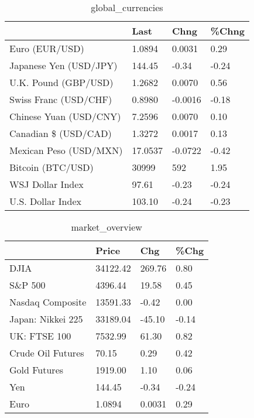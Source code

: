 \documentclass{article}%
\begin{document}
%


\begin{table}[htbp]%
\caption{global\_currencies}%
\centering%
\begin{adjustbox}{width=1\textwidth}%
\begin{tabular}{llll}
\toprule
                       &    Last &    Chng & \%Chng \\
\midrule
        Euro (EUR/USD) &  1.0894 &  0.0031 &  0.29 \\
Japanese Yen (USD/JPY) &  144.45 &   -0.34 & -0.24 \\
  U.K. Pound (GBP/USD) &  1.2682 &  0.0070 &  0.56 \\
 Swiss Franc (USD/CHF) &  0.8980 & -0.0016 & -0.18 \\
Chinese Yuan (USD/CNY) &  7.2596 &  0.0070 &  0.10 \\
  Canadian \$ (USD/CAD) &  1.3272 &  0.0017 &  0.13 \\
Mexican Peso (USD/MXN) & 17.0537 & -0.0722 & -0.42 \\
     Bitcoin (BTC/USD) &   30999 &     592 &  1.95 \\
      WSJ Dollar Index &   97.61 &   -0.23 & -0.24 \\
     U.S. Dollar Index &  103.10 &   -0.24 & -0.23 \\
\bottomrule
\end{tabular}
%
\end{adjustbox}%
\end{table}

%


\begin{table}[htbp]%
\caption{market\_overview}%
\centering%
\begin{adjustbox}{width=1\textwidth}%
\begin{tabular}{llll}
\toprule
                  &    Price &    Chg &  \%Chg \\
\midrule
             DJIA & 34122.42 & 269.76 &  0.80 \\
          S\&P 500 &  4396.44 &  19.58 &  0.45 \\
 Nasdaq Composite & 13591.33 &  -0.42 &  0.00 \\
Japan: Nikkei 225 & 33189.04 & -45.10 & -0.14 \\
     UK: FTSE 100 &  7532.99 &  61.30 &  0.82 \\
Crude Oil Futures &    70.15 &   0.29 &  0.42 \\
     Gold Futures &  1919.00 &   1.10 &  0.06 \\
              Yen &   144.45 &  -0.34 & -0.24 \\
             Euro &   1.0894 & 0.0031 &  0.29 \\
\bottomrule
\end{tabular}
%
\end{adjustbox}%
\end{table}

%
\end{document}

